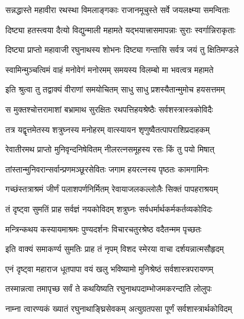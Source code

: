 \twolineshloka
{सन्नद्धास्ते महावीरा रथस्था विमलाङ्गकाः}
{राजानमूचुस्ते सर्वे जयलक्ष्म्या समन्विताः}%


\twolineshloka
{दिष्ट्या हतस्त्वया दैत्यो विद्युन्माली महामते}
{यद्भयात्त्रासमापन्नाः सुराः स्वर्गान्निराकृताः}%

\twolineshloka
{दिष्ट्या प्राप्तो महावाजी रघुनाथस्य शोभनः}
{दिष्ट्या गन्तासि सर्वत्र जयं तु क्षितिमण्डले}%

\twolineshloka
{स्वामिन्मुञ्चत्विमं वाहं मनोवेगं मनोरमम्}
{समयस्य विलम्बो मा भवत्वत्र महामते}%


\twolineshloka
{इति श्रुत्वा तु तद्वाक्यं वीराणां समयोचितम्}
{साधु साधु प्रशस्यैतान्मुमोच हयसत्तमम्}%

\twolineshloka
{स मुक्तश्चोत्तरामाशां बभ्रामाथ सुरक्षितः}
{रथपत्तिहयश्रेष्ठैः सर्वशस्त्रास्त्रकोविदैः}%

\twolineshloka
{तत्र यद्वृत्तमेतस्य शत्रुघ्नस्य मनोहरम्}
{वात्स्यायन शृणुष्वैतत्पापराशिप्रदाहकम्}%

\twolineshloka
{रेवातीरमथ प्राप्तो मुनिवृन्दनिषेवितम्}
{नीलरत्नसमूहस्य रसः किं तु पयो मिषात्}%

\twolineshloka
{तांस्तान्मुनिवरान्सर्वान्प्रणमञ्छूरसेवितः}
{जगाम हयरत्नस्य पृष्ठतः कामगामिनः}%

\twolineshloka
{गच्छंस्तत्राश्रमं जीर्णं पलाशपर्णनिर्मितम्}
{रेवायाजलकल्लोलैः सिक्तं पापहराश्रयम्}%

\twolineshloka
{तं दृष्ट्वा सुमतिं प्राह सर्वज्ञं नयकोविदम्}
{शत्रुघ्नः सर्वधर्मार्थकर्मकर्तव्यकोविदः}%


\twolineshloka
{मन्त्रिन्कथय कस्यायमाश्रमः पुण्यदर्शनः}
{विचारचतुरश्रेष्ठ वदैतन्मम पृच्छतः}%


\twolineshloka
{इति वाक्यं समाकर्ण्य सुमतिः प्राह तं नृपम्}
{विशद स्मेरया वाचा दर्शयन्नात्मसौहृदम्}%


\twolineshloka
{एनं दृष्ट्वा महाराज धूतपापा वयं खलु}
{भविष्यामो मुनिश्रेष्ठं सर्वशास्त्रपरायणम्}%

\twolineshloka
{तस्मान्नत्वा तमापृच्छ सर्वं ते कथयिष्यति}
{रघुनाथपदाम्भोजमकरन्दाति लोलुपः}%

\twolineshloka
{नाम्ना त्वारण्यकं ख्यातं रघुनाथाङ्घ्रिसेवकम्}
{अत्युग्रतपसा पूर्णं सर्वशास्त्रार्थकोविदम्}%

